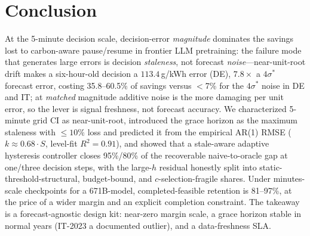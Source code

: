 \documentclass[sigconf,nonacm=false]{acmart}
\begin{document}
\section{Conclusion}
\label{sec:conclusion}
At the 5-minute decision scale, decision-error \emph{magnitude} dominates the
savings lost to carbon-aware pause/resume in frontier LLM pretraining: the
failure mode that generates large errors is decision \emph{staleness}, not
forecast \emph{noise}---near-unit-root drift makes a six-hour-old decision a
$113.4$\,g/kWh error (DE), $7.8\times$ a $4\sigma^*$ forecast error, costing
35.8--60.5\% of savings versus $<$7\% for the $4\sigma^*$ noise in DE and IT; at
\emph{matched} magnitude additive noise is the more damaging per unit error, so
the lever is signal freshness, not forecast accuracy. We
characterized 5-minute grid CI as near-unit-root, introduced the grace horizon
as the maximum staleness with $\le10\%$ loss and predicted it from the empirical
AR(1) RMSE ($k{\approx}0.68\cdot S$, level-fit $R^2{=}0.91$), and showed that a
stale-aware adaptive hysteresis controller closes 95\%/80\% of the recoverable
naive-to-oracle gap at one/three decision steps, with the large-$h$ residual
honestly split into static-threshold-structural, budget-bound, and
$c$-selection-fragile shares. Under minutes-scale checkpoints for a 671B-model,
completed-feasible retention is 81--97\%, at the price of a wider margin and an
explicit completion constraint. The takeaway is a forecast-agnostic design kit:
near-zero margin scale, a grace horizon stable in normal years (IT-2023 a
documented outlier), and a data-freshness SLA.



\end{document}
